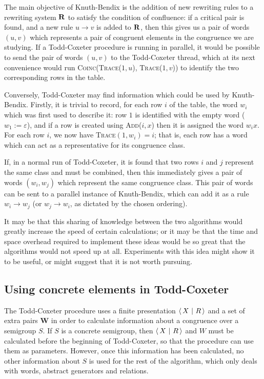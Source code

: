 The main objective of Knuth-Bendix is the addition of new rewriting rules to a
rewriting system $\mathbf{R}$ to satisfy the condition of confluence: if a critical
pair is found, and a new rule $u \to v$ is added to $\mathbf{R}$, then this gives us a
pair of words $(u,v)$ which represents a pair of congruent elements in the congruence we
are studying.  If a Todd-Coxeter procedure is running in parallel, it would be
possible to send the pair of words $(u,v)$ to the Todd-Coxeter thread, which
at its next convenience would run \textsc{Coinc(Trace($1, u$), Trace($1, v$))}
to identify the two corresponding rows in the table.

Conversely, Todd-Coxeter may find information which could be used by
Knuth-Bendix.  Firstly, it is trivial to record, for each row $i$ of the table,
the word $w_i$ which was first used to describe it: row $1$ is identified with
the empty word ($w_1 := \varepsilon$), and if a row is created using
\textsc{Add($i, x$)} then it is assigned the word $w_ix$.  For each row $i$, we
now have \textsc{Trace}$(1, w_i) = i$; that is, each row has a word which can
act as a representative for its congruence class.

If, in a normal run of Todd-Coxeter, it is found that two rows $i$ and $j$
represent the same class and must be combined, then this immediately gives a
pair of words $(w_i,w_j)$ which represent the same congruence class.  This pair
of words can be sent to a parallel instance of Knuth-Bendix, which can add it as
a rule $w_i \to w_j$ (or $w_j \to w_i$, as dictated by the chosen ordering).

It may be that this sharing of knowledge between the two algorithms would
greatly increase the speed of certain calculations; or it may be that the time
and space overhead required to implement these ideas would be so great that the
algorithms would not speed up at all.  Experiments with this idea might show it
to be useful, or might suggest that it is not worth pursuing.

\subsection{Using concrete elements in Todd-Coxeter}
\label{sec:tc-concrete-elms}
The Todd-Coxeter procedure uses a finite presentation $\left\langle\,X ~\middle|~ R\,\right\rangle$ and a set of
extra pairs $\mathbf{W}$ in order to calculate information about a congruence
over a semigroup $S$.  If $S$ is a concrete semigroup, then $\left\langle\,X ~\middle|~ R\,\right\rangle$ and $W$
must be calculated before the beginning of Todd-Coxeter, so that the procedure
can use them as parameters.  However, once this information has been calculated,
no other information about $S$ is used for the rest of the algorithm, which only
deals with words, abstract generators and relations.

